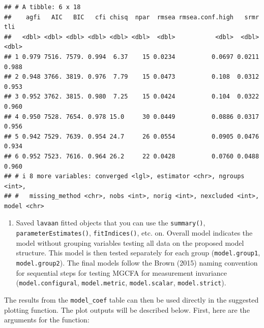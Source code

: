 \documentclass[
  man]{apa6}
\newenvironment{Shaded}{\begin{snugshade}}{\end{snugshade}}
\newcommand{\FunctionTok}[1]{\textcolor[rgb]{0.00,0.00,0.00}{#1}}
\newcommand{\NormalTok}[1]{#1}
\newcommand{\SpecialCharTok}[1]{\textcolor[rgb]{0.00,0.00,0.00}{#1}}
\providecommand{\tightlist}{%
  \setlength{\itemsep}{0pt}\setlength{\parskip}{0pt}}
\begin{document}
\small

\begin{Shaded}
\end{Shaded}

\normalsize

\begin{verbatim}
## # A tibble: 6 x 18
##    agfi   AIC   BIC   cfi chisq  npar  rmsea rmsea.conf.high   srmr   tli
##   <dbl> <dbl> <dbl> <dbl> <dbl> <dbl>  <dbl>           <dbl>  <dbl> <dbl>
## 1 0.979 7516. 7579. 0.994  6.37    15 0.0234          0.0697 0.0211 0.988
## 2 0.948 3766. 3819. 0.976  7.79    15 0.0473          0.108  0.0312 0.953
## 3 0.952 3762. 3815. 0.980  7.25    15 0.0424          0.104  0.0322 0.960
## 4 0.950 7528. 7654. 0.978 15.0     30 0.0449          0.0886 0.0317 0.956
## 5 0.942 7529. 7639. 0.954 24.7     26 0.0554          0.0905 0.0476 0.934
## 6 0.952 7523. 7616. 0.964 26.2     22 0.0428          0.0760 0.0488 0.960
## # i 8 more variables: converged <lgl>, estimator <chr>, ngroups <int>,
## #   missing_method <chr>, nobs <int>, norig <int>, nexcluded <int>, model <chr>
\end{verbatim}

\begin{enumerate}
\def\labelenumi{\arabic{enumi})}
\setcounter{enumi}{2}
\tightlist
\item
  Saved \texttt{lavaan} fitted objects that you can use the \texttt{summary()}, \texttt{parameterEstimates()}, \texttt{fitIndices()}, etc. on. Overall model indicates the model without grouping variables testing all data on the proposed model structure. This model is then tested separately for each group (\texttt{model.group1}, \texttt{model.group2}). The final models follow the Brown (2015) naming convention for sequential steps for testing MGCFA for measurement invariance (\texttt{model.configural}, \texttt{model.metric}, \texttt{model.scalar}, \texttt{model.strict}).
\end{enumerate}

The results from the \texttt{model\_coef} table can then be used directly in the suggested plotting function. The plot outputs will be described below. First, here are the arguments for the function:
\end{document}

